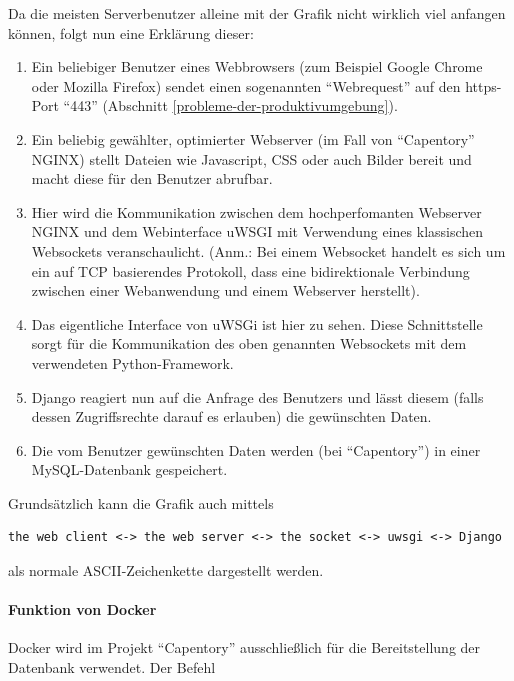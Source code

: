 Da die meisten Serverbenutzer alleine mit der Grafik nicht wirklich viel
anfangen können, folgt nun eine Erklärung dieser:

\begin{enumerate}
\def\labelenumi{\arabic{enumi}.}
\tightlist
\item
  Ein beliebiger Benutzer eines Webbrowsers (zum Beispiel Google Chrome
  oder Mozilla Firefox) sendet einen sogenannten ``Webrequest'' auf den
  https-Port ``443'' (Abschnitt \ref{probleme-der-produktivumgebung}).
\item
  Ein beliebig gewählter, optimierter Webserver (im Fall von
  ``Capentory'' NGINX) stellt Dateien wie Javascript, CSS oder auch
  Bilder bereit und macht diese für den Benutzer abrufbar.
\item
  Hier wird die Kommunikation zwischen dem hochperfomanten Webserver
  NGINX und dem Webinterface uWSGI mit Verwendung eines klassischen
  Websockets veranschaulicht. (Anm.: Bei einem Websocket handelt es sich
  um ein auf TCP basierendes Protokoll, dass eine bidirektionale
  Verbindung zwischen einer Webanwendung und einem Webserver herstellt).
\item
  Das eigentliche Interface von uWSGi ist hier zu sehen. Diese
  Schnittstelle sorgt für die Kommunikation des oben genannten
  Websockets mit dem verwendeten Python-Framework.
\item
  Django reagiert nun auf die Anfrage des Benutzers und lässt diesem
  (falls dessen Zugriffsrechte darauf es erlauben) die gewünschten
  Daten.
\item
  Die vom Benutzer gewünschten Daten werden (bei ``Capentory'') in einer
  MySQL-Datenbank gespeichert.
\end{enumerate}

Grundsätzlich kann die Grafik auch mittels

\begin{verbatim}
the web client <-> the web server <-> the socket <-> uwsgi <-> Django
\end{verbatim}

als normale ASCII-Zeichenkette dargestellt werden.

\hypertarget{funktion-von-docker}{%
\paragraph{Funktion von Docker}\label{funktion-von-docker}}

Docker wird im Projekt ``Capentory'' ausschließlich für die
Bereitstellung der Datenbank verwendet. Der Befehl


